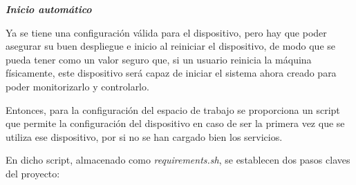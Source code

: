         
        
        
        \textit{\textbf{Inicio automático}}
        
        Ya se tiene una configuración válida para el dispositivo, pero hay que poder asegurar su buen despliegue e inicio al reiniciar el dispositivo, de modo que se pueda tener como un valor seguro que, si un usuario reinicia la máquina físicamente, este dispositivo será capaz de iniciar el sistema ahora creado para poder monitorizarlo y controlarlo.
        
        Entonces, para la configuración del espacio de trabajo se proporciona un script que permite la configuración del dispositivo en caso de ser la primera vez que se utiliza ese dispositivo, por si no se han cargado bien los servicios.
        
        En dicho script, almacenado como \textit{requirements.sh}, se establecen dos pasos claves del proyecto:
        
